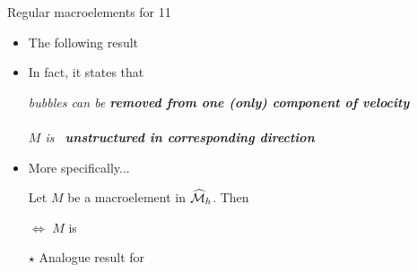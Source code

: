 \begin{frame}{Regular macroelements for 11}
  \begin{itemize}\itemsep1em
  \item The following result 
\item In fact, it states that ~\medskip
  \quad

  \begin{BlockNoTitle}
    \begin{center} \it bubbles can be
      \textbf{\itshape removed from one (only) component of velocity} \\
      \\
      $M$ is \it \ \textbf{\itshape unstructured in corresponding
        direction}
    \end{center}
  \end{BlockNoTitle}

\item More specifically...
  \begin{theorem}
    Let $M$ be a macroelement in $\widehat{\cal M}_h$.
    Then
    \begin{center}
       $\Leftrightarrow$ $M$ is
    \end{center}
  \end{theorem}
  \item[$\star$] Analogue result for 
\end{itemize}
\end{frame}

